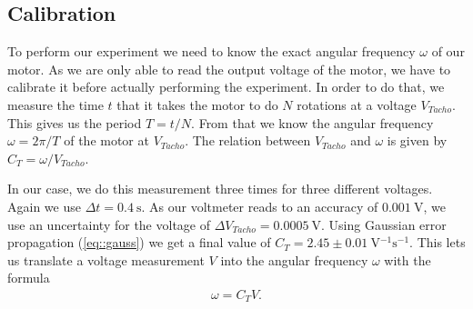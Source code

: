 \subsection{Calibration}

To perform our experiment we need to know the exact angular frequency $\omega$ of our motor.
As we are only able to read the output voltage of the motor, we have to calibrate it before actually performing the experiment.
In order to do that, we measure the time $t$ that it takes the motor to do $N$ rotations at a voltage $V_{Tacho}$.
This gives us the period $T = t/N$.
From that we know the angular frequency  $\omega = 2 \pi/T$  of the motor at $V_{Tacho}$.
The relation between $V_{Tacho}$ and $\omega$ is given by $C_T = \omega/V_{Tacho}$.

In our case, we do this measurement three times for three different voltages.
Again we use $\Delta t = \SI{0.4}{\second}$.
As our voltmeter reads to an accuracy of $\SI{0.001}{\volt}$, we use an uncertainty for the voltage of $\Delta V_{Tacho} = \SI{0.0005}{\volt}$.
Using Gaussian error propagation (\ref{eq::gauss}) we get a final value of $C_T = 2.45 \pm \SI{0.01}{\volt^{-1}\second^{-1}}$.
This lets us translate a voltage measurement $V$ into the angular frequency $\omega$ with the formula 
\begin{align*}
	\omega = C_T V.
	\label{eq::calibration}
\end{align*}


